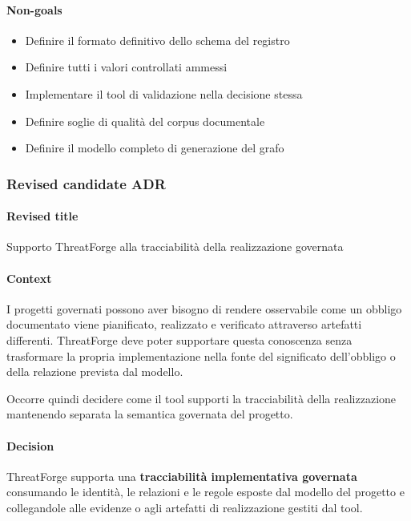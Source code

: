 \documentclass[
  10pt,
]{article}
\providecommand{\tightlist}{%
  \setlength{\itemsep}{0pt}\setlength{\parskip}{0pt}}
\begin{document}
\paragraph{Non-goals}\label{non-goals-2}

\begin{itemize}
\tightlist
\item
  Definire il formato definitivo dello schema del registro
\item
  Definire tutti i valori controllati ammessi
\item
  Implementare il tool di validazione nella decisione stessa
\item
  Definire soglie di qualità del corpus documentale
\item
  Definire il modello completo di generazione del grafo
\end{itemize}

\subsubsection{Revised candidate ADR}\label{revised-candidate-adr-2}

\paragraph{Revised title}\label{revised-title-2}

Supporto ThreatForge alla tracciabilità della realizzazione governata

\paragraph{Context}\label{context-5}

I progetti governati possono aver bisogno di rendere osservabile come un
obbligo documentato viene pianificato, realizzato e verificato
attraverso artefatti differenti. ThreatForge deve poter supportare
questa conoscenza senza trasformare la propria implementazione nella
fonte del significato dell'obbligo o della relazione prevista dal
modello.

Occorre quindi decidere come il tool supporti la tracciabilità della
realizzazione mantenendo separata la semantica governata del progetto.

\paragraph{Decision}\label{decision-5}

ThreatForge supporta una \textbf{tracciabilità implementativa governata}
consumando le identità, le relazioni e le regole esposte dal modello del
progetto e collegandole alle evidenze o agli artefatti di realizzazione
gestiti dal tool.
\end{document}

